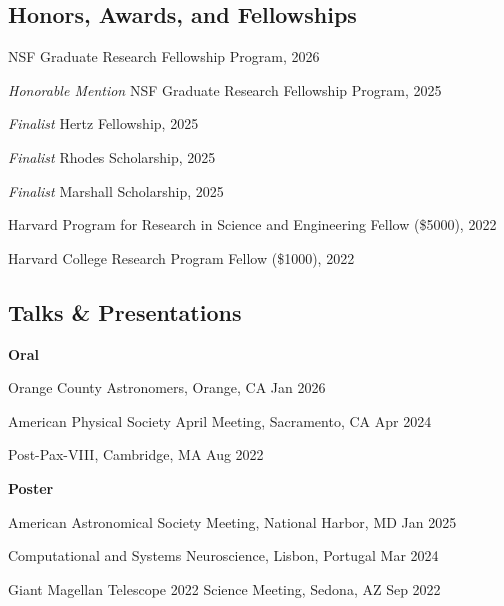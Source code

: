 \documentclass[12pt,letterpaper]{article}
\begin{document}
\subsection{Honors, Awards, and Fellowships}
\begin{list}{}{\cvlist}

  \item NSF Graduate Research Fellowship Program, 2026
  \item \textit{Honorable Mention} NSF Graduate Research Fellowship Program, 2025
  \item \textit{Finalist} Hertz Fellowship, 2025
  \item \textit{Finalist} Rhodes Scholarship, 2025
  \item \textit{Finalist} Marshall Scholarship, 2025
  \item Harvard Program for Research in Science and Engineering Fellow (\$5000), 2022
  \item Harvard College Research Program Fellow (\$1000), 2022

\end{list}

\subsection{Talks \& Presentations}
\begin{list}{}{\cvlist}
  \item \textbf{Oral}
  \begin{bulletdescription}
    \item Orange County Astronomers, Orange, CA \hfill \textcolor{niceblue}{Jan 2026}
    \item American Physical Society April Meeting, Sacramento, CA \hfill \textcolor{niceblue}{Apr 2024}
    \item Post-Pax-VIII, Cambridge, MA \hfill \textcolor{niceblue}{Aug 2022}
  \end{bulletdescription}

  \item \textbf{Poster}
  \begin{bulletdescription}
    \item American Astronomical Society Meeting, National Harbor, MD \hfill \textcolor{niceblue}{Jan 2025}
    \item Computational and Systems Neuroscience, Lisbon, Portugal \hfill \textcolor{niceblue}{Mar 2024}
    \item Giant Magellan Telescope 2022 Science Meeting, Sedona, AZ \hfill \textcolor{niceblue}{Sep 2022}
  \end{bulletdescription}
\end{list}
\end{document}
